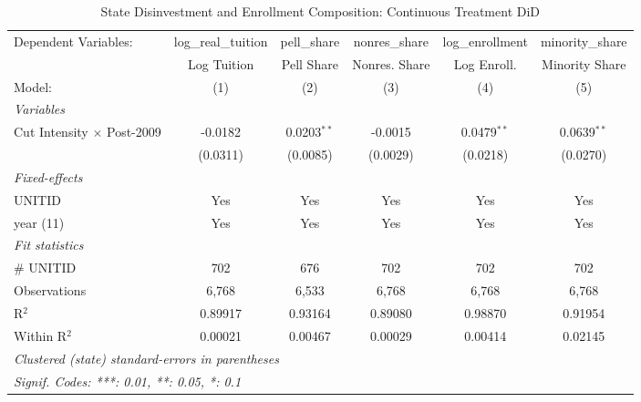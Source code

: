 
\begin{table}[htbp]
   \caption{\label{tab:main} State Disinvestment and Enrollment Composition: Continuous Treatment DiD}
   \centering
   \small
   \begin{adjustbox}{max width=\textwidth}
   \begin{tabular}{lccccc}
      \tabularnewline \midrule \midrule
      Dependent Variables:              & log\_real\_tuition   & pell\_share   & nonres\_share  & log\_enrollment  & minority\_share\\   
                                        & Log Tuition          & Pell Share    & Nonres. Share  & Log Enroll.      & Minority Share \\   
      Model:                            & (1)                  & (2)           & (3)            & (4)              & (5)\\  
      \midrule
      \emph{Variables}\\
      Cut Intensity $\times$ Post-2009  & -0.0182              & 0.0203$^{**}$ & -0.0015        & 0.0479$^{**}$    & 0.0639$^{**}$\\   
                                        & (0.0311)             & (0.0085)      & (0.0029)       & (0.0218)         & (0.0270)\\   
      \midrule
      \emph{Fixed-effects}\\
      UNITID                            & Yes                  & Yes           & Yes            & Yes              & Yes\\  
      year (11)                         & Yes                  & Yes           & Yes            & Yes              & Yes\\  
      \midrule
      \emph{Fit statistics}\\
      \# UNITID                         & 702                  & 676           & 702            & 702              & 702\\  
      Observations                      & 6,768                & 6,533         & 6,768          & 6,768            & 6,768\\  
      R$^2$                             & 0.89917              & 0.93164       & 0.89080        & 0.98870          & 0.91954\\  
      Within R$^2$                      & 0.00021              & 0.00467       & 0.00029        & 0.00414          & 0.02145\\  
      \midrule \midrule
      \multicolumn{6}{l}{\emph{Clustered (state) standard-errors in parentheses}}\\
      \multicolumn{6}{l}{\emph{Signif. Codes: ***: 0.01, **: 0.05, *: 0.1}}\\
   \end{tabular}
   \end{adjustbox}
\end{table}


